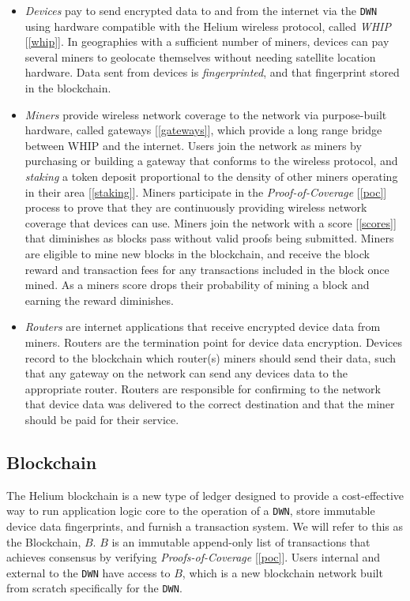 \documentclass[letterpaper,11pt]{article}
\begin{document}
\begin{itemize}
	\item \emph{Devices} pay to send encrypted data to and from the internet via the \verb|DWN| using hardware compatible with the Helium wireless protocol, called \emph{WHIP} [\ref{whip}]. In geographies with a sufficient number of miners, devices can pay several miners to geolocate themselves without needing satellite location hardware. Data sent from devices is \emph{fingerprinted}, and that fingerprint stored in the blockchain.
	\item \emph{Miners} provide wireless network coverage to the network via purpose-built hardware, called gateways [\ref{gateways}], which provide a long range bridge between WHIP and the internet. Users join the network as miners by purchasing or building a gateway that conforms to the wireless protocol, and \emph{staking} a token deposit proportional to the density of other miners operating in their area [\ref{staking}]. Miners participate in the \emph{Proof-of-Coverage} [\ref{poc}] process to prove that they are continuously providing wireless network coverage that devices can use. Miners join the network with a score [\ref{scores}] that diminishes as blocks pass without valid proofs being submitted. Miners are eligible to mine new blocks in the blockchain, and receive the block reward and transaction fees for any transactions included in the block once mined. As a miners score drops their probability of mining a block and earning the reward diminishes.
	\item \emph{Routers} are internet applications that receive encrypted device data from miners. Routers are the termination point for device data encryption. Devices record to the blockchain which router(s) miners should send their data, such that any gateway on the network can send any devices data to the appropriate router. Routers are responsible for confirming to the network that device data was delivered to the correct destination and that the miner should be paid for their service.
\end{itemize}

\subsection{Blockchain}

The Helium blockchain is a new type of ledger designed to provide a cost-effective way to run application logic core to the operation of a \verb|DWN|, store immutable device data fingerprints, and furnish a transaction system. We will refer to this as the Blockchain, $\mathit{B}$. $\mathit{B}$ is an immutable append-only list of transactions that achieves consensus by verifying \emph{Proofs-of-Coverage} [\ref{poc}]. Users internal and external to the \verb|DWN| have access to $\mathit{B}$, which is a new blockchain network built from scratch specifically for the \verb|DWN|.\newline
\end{document}
